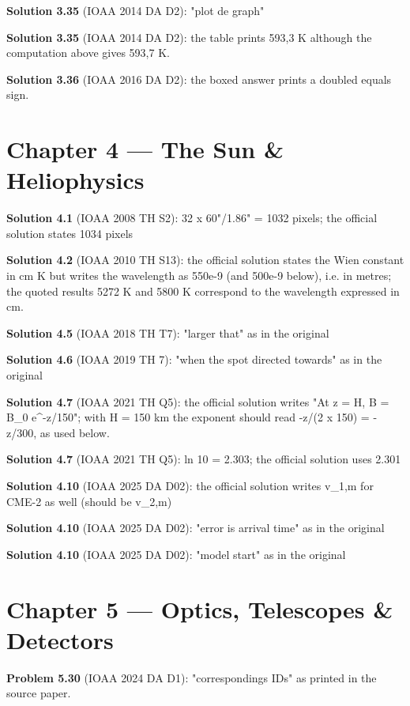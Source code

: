 \noindent\textbf{Solution 3.35} (IOAA 2014 DA D2): "plot de graph"
\smallskip

\noindent\textbf{Solution 3.35} (IOAA 2014 DA D2): the table prints 593,3 K although the computation above gives 593,7 K.
\smallskip

\noindent\textbf{Solution 3.36} (IOAA 2016 DA D2): the boxed answer prints a doubled equals sign.
\smallskip

\section*{Chapter 4 --- The Sun \& Heliophysics}

\noindent\textbf{Solution 4.1} (IOAA 2008 TH S2): 32 x 60"/1.86" = 1032 pixels; the official solution states 1034 pixels
\smallskip

\noindent\textbf{Solution 4.2} (IOAA 2010 TH S13): the official solution states the Wien constant in cm K but writes the wavelength as 550e-9 (and 500e-9 below), i.e. in metres; the quoted results 5272 K and 5800 K correspond to the wavelength expressed in cm.
\smallskip

\noindent\textbf{Solution 4.5} (IOAA 2018 TH T7): "larger that" as in the original
\smallskip

\noindent\textbf{Solution 4.6} (IOAA 2019 TH 7): "when the spot directed towards" as in the original
\smallskip

\noindent\textbf{Solution 4.7} (IOAA 2021 TH Q5): the official solution writes "At z = H, B = B\_0 e\^{}{-z/150}"; with H = 150 km the exponent should read -z/(2 x 150) = -z/300, as used below.
\smallskip

\noindent\textbf{Solution 4.7} (IOAA 2021 TH Q5): ln 10 = 2.303; the official solution uses 2.301
\smallskip

\noindent\textbf{Solution 4.10} (IOAA 2025 DA D02): the official solution writes v\_{1,m} for CME-2 as well (should be v\_{2,m})
\smallskip

\noindent\textbf{Solution 4.10} (IOAA 2025 DA D02): "error is arrival time" as in the original
\smallskip

\noindent\textbf{Solution 4.10} (IOAA 2025 DA D02): "model start" as in the original
\smallskip

\section*{Chapter 5 --- Optics, Telescopes \& Detectors}

\noindent\textbf{Problem 5.30} (IOAA 2024 DA D1): "correspondings IDs" as printed in the source paper.
\smallskip


